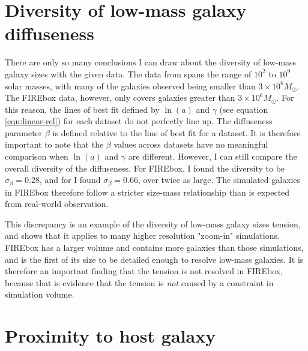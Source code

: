 \section{Diversity of low-mass galaxy diffuseness}

There are only so many conclusions I can draw about the diversity of low-mass galaxy sizes with the given data. The data from \cite{mcconnachieOBSERVEDPROPERTIESDWARF2012} spans the range of $10^2$ to $10^9$ solar masses, with many of the galaxies observed being smaller than $3 \times 10^6 M_\odot$. The FIREbox data, however, only covers galaxies greater than $3 \times 10^6 M_\odot$. For this reason, the lines of best fit defined by $\ln(a)$ and $\gamma$ (see equation \ref{equ:linear-rel}) for each dataset do not perfectly line up. %
The diffuseness parameter $\beta$ is defined relative to the line of best fit for a dataset. It is therefore important to note that the $\beta$ values across datasets have no meaningful comparison when $\ln(a)$ and $\gamma$ are different. However, I can still compare the overall diversity of the diffuseness. For FIREbox, I found the diversity to be $\sigma_\beta = 0.28$, and for \cite{mcconnachieOBSERVEDPROPERTIESDWARF2012} I found $\sigma_\beta = 0.66$, over twice as large. The simulated galaxies in FIREbox therefore follow a stricter size-mass relationship than is expected from real-world observation.

This discrepancy is an example of the diversity of low-mass galaxy sizes tension, and \cite{salesBaryonicSolutionsChallenges2022} shows that it applies to many higher resolution "zoom-in" simulations. FIREbox has a larger volume and contains more galaxies than those simulations, and is the first of its size to be detailed enough to resolve low-mass galaxies. It is therefore an important finding that the tension is not resolved in FIREbox, because that is evidence that the tension is \emph{not} caused by a constraint in simulation volume.


\section{Proximity to host galaxy}

